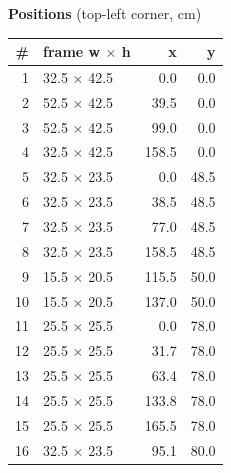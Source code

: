 \documentclass[a4paper,landscape,10pt]{article}
\begin{document}
\begin{minipage}[t]{0.25\textwidth}
\vspace{8pt}
{\bfseries Positions} (top-left corner, cm)\\[2pt]
\tiny
\begin{tabular}{@{}r l r r@{}}
\toprule
\# & frame w $\times$ h & x & y \\
\midrule
1 & 32.5 $\times$ 42.5 & 0.0 & 0.0 \\
2 & 52.5 $\times$ 42.5 & 39.5 & 0.0 \\
3 & 52.5 $\times$ 42.5 & 99.0 & 0.0 \\
4 & 32.5 $\times$ 42.5 & 158.5 & 0.0 \\
5 & 32.5 $\times$ 23.5 & 0.0 & 48.5 \\
6 & 32.5 $\times$ 23.5 & 38.5 & 48.5 \\
7 & 32.5 $\times$ 23.5 & 77.0 & 48.5 \\
8 & 32.5 $\times$ 23.5 & 158.5 & 48.5 \\
9 & 15.5 $\times$ 20.5 & 115.5 & 50.0 \\
10 & 15.5 $\times$ 20.5 & 137.0 & 50.0 \\
11 & 25.5 $\times$ 25.5 & 0.0 & 78.0 \\
12 & 25.5 $\times$ 25.5 & 31.7 & 78.0 \\
13 & 25.5 $\times$ 25.5 & 63.4 & 78.0 \\
14 & 25.5 $\times$ 25.5 & 133.8 & 78.0 \\
15 & 25.5 $\times$ 25.5 & 165.5 & 78.0 \\
16 & 32.5 $\times$ 23.5 & 95.1 & 80.0 \\
\bottomrule
\end{tabular}
\end{minipage}
\clearpage
\end{document}
